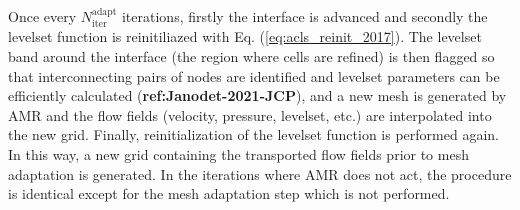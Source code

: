 Once every $N_\mathrm{iter}^\mathrm{adapt}$ iterations, firstly the interface is advanced and secondly the levelset function is reinitiliazed with Eq. (\ref{eq:acls_reinit_2017}). The levelset band around the interface (the region where cells are refined) is then flagged so that interconnecting pairs of nodes are identified and levelset parameters can be efficiently calculated (\textbf{ref:Janodet-2021-JCP}), and a new mesh is generated by AMR and the flow fields (velocity, pressure, levelset, etc.) are interpolated into the new grid. Finally, reinitialization of the levelset function is performed again. In this way, a new grid containing the transported flow fields prior to mesh adaptation is generated. In the iterations where AMR does not act, the procedure is identical except for the mesh adaptation step which is not performed. %

